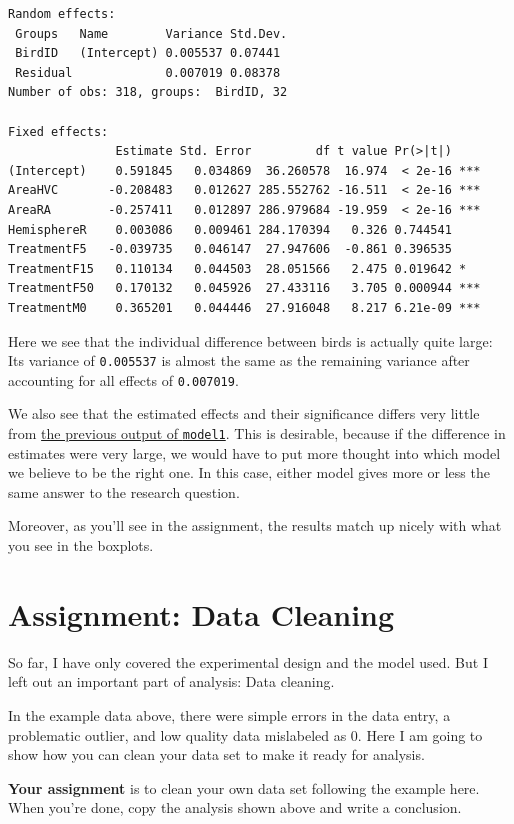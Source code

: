 \documentclass[
]{book}
\begin{document}
\begin{verbatim}
Random effects:
 Groups   Name        Variance Std.Dev.
 BirdID   (Intercept) 0.005537 0.07441 
 Residual             0.007019 0.08378 
Number of obs: 318, groups:  BirdID, 32

Fixed effects:
               Estimate Std. Error         df t value Pr(>|t|)    
(Intercept)    0.591845   0.034869  36.260578  16.974  < 2e-16 ***
AreaHVC       -0.208483   0.012627 285.552762 -16.511  < 2e-16 ***
AreaRA        -0.257411   0.012897 286.979684 -19.959  < 2e-16 ***
HemisphereR    0.003086   0.009461 284.170394   0.326 0.744541    
TreatmentF5   -0.039735   0.046147  27.947606  -0.861 0.396535    
TreatmentF15   0.110134   0.044503  28.051566   2.475 0.019642 *  
TreatmentF50   0.170132   0.045926  27.433116   3.705 0.000944 ***
TreatmentM0    0.365201   0.044446  27.916048   8.217 6.21e-09 ***
\end{verbatim}

Here we see that the individual difference between birds is actually quite large: Its variance of \texttt{0.005537} is almost the same as the remaining variance after accounting for all effects of \texttt{0.007019}.

We also see that the estimated effects and their significance differs very little from \protect\hyperlink{interpretbrain}{the previous output of \texttt{model1}}. This is desirable, because if the difference in estimates were very large, we would have to put more thought into which model we believe to be the right one. In this case, either model gives more or less the same answer to the research question.

Moreover, as you'll see in the assignment, the results match up nicely with what you see in the boxplots.

\hypertarget{assignment-data-cleaning}{%
\section{Assignment: Data Cleaning}\label{assignment-data-cleaning}}

So far, I have only covered the experimental design and the model used. But I left out an important part of analysis: Data cleaning.

In the example data above, there were simple errors in the data entry, a problematic outlier, and low quality data mislabeled as \(0\). Here I am going to show how you can clean your data set to make it ready for analysis.

\textbf{Your assignment} is to clean your own data set following the example here. When you're done, copy the analysis shown above and write a conclusion.
\end{document}
